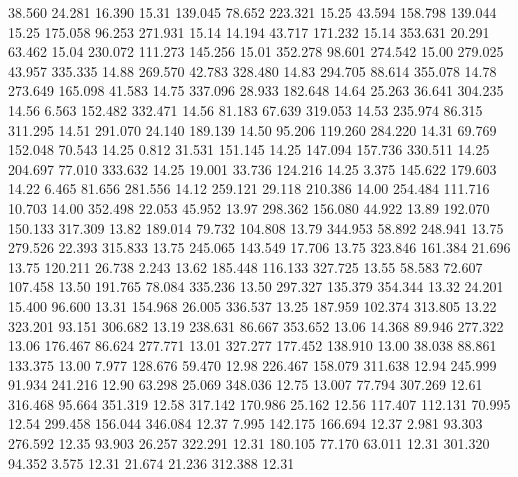   38.560   24.281   16.390        15.31
 139.045   78.652  223.321        15.25
  43.594  158.798  139.044        15.25
 175.058   96.253  271.931        15.14
  14.194   43.717  171.232        15.14
 353.631   20.291   63.462        15.04
 230.072  111.273  145.256        15.01
 352.278   98.601  274.542        15.00
 279.025   43.957  335.335        14.88
 269.570   42.783  328.480        14.83
 294.705   88.614  355.078        14.78
 273.649  165.098   41.583        14.75
 337.096   28.933  182.648        14.64
  25.263   36.641  304.235        14.56
   6.563  152.482  332.471        14.56
  81.183   67.639  319.053        14.53
 235.974   86.315  311.295        14.51
 291.070   24.140  189.139        14.50
  95.206  119.260  284.220        14.31
  69.769  152.048   70.543        14.25
   0.812   31.531  151.145        14.25
 147.094  157.736  330.511        14.25
 204.697   77.010  333.632        14.25
  19.001   33.736  124.216        14.25
   3.375  145.622  179.603        14.22
   6.465   81.656  281.556        14.12
 259.121   29.118  210.386        14.00
 254.484  111.716   10.703        14.00
 352.498   22.053   45.952        13.97
 298.362  156.080   44.922        13.89
 192.070  150.133  317.309        13.82
 189.014   79.732  104.808        13.79
 344.953   58.892  248.941        13.75
 279.526   22.393  315.833        13.75
 245.065  143.549   17.706        13.75
 323.846  161.384   21.696        13.75
 120.211   26.738    2.243        13.62
 185.448  116.133  327.725        13.55
  58.583   72.607  107.458        13.50
 191.765   78.084  335.236        13.50
 297.327  135.379  354.344        13.32
  24.201   15.400   96.600        13.31
 154.968   26.005  336.537        13.25
 187.959  102.374  313.805        13.22
 323.201   93.151  306.682        13.19
 238.631   86.667  353.652        13.06
  14.368   89.946  277.322        13.06
 176.467   86.624  277.771        13.01
 327.277  177.452  138.910        13.00
  38.038   88.861  133.375        13.00
   7.977  128.676   59.470        12.98
 226.467  158.079  311.638        12.94
 245.999   91.934  241.216        12.90
  63.298   25.069  348.036        12.75
  13.007   77.794  307.269        12.61
 316.468   95.664  351.319        12.58
 317.142  170.986   25.162        12.56
 117.407  112.131   70.995        12.54
 299.458  156.044  346.084        12.37
   7.995  142.175  166.694        12.37
   2.981   93.303  276.592        12.35
  93.903   26.257  322.291        12.31
 180.105   77.170   63.011        12.31
 301.320   94.352    3.575        12.31
  21.674   21.236  312.388        12.31
